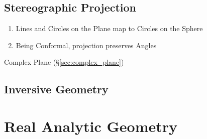 \subsection{Stereographic Projection}\label{sec:stereographic_projection}

\begin{enumerate}
  \item Lines and Circles on the Plane map to Circles on the Sphere
  \item Being Conformal, projection preserves Angles
\end{enumerate}

Complex Plane (\S\ref{sec:complex_plane})



\subsection{Inversive Geometry}\label{sec:inversive_geometry}



\section{Real Analytic Geometry}\label{sec:real_analytic_geometry}
